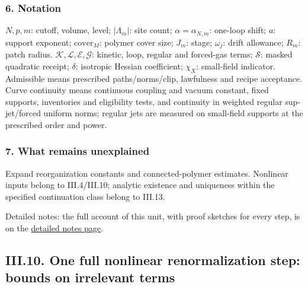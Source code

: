\documentclass[
  letterpaper,
  11pt]{article}
\begin{document}
\subsubsection{6. Notation}\label{notation-11}

\(N,p,m\): cutoff, volume, level; \(|\Lambda_m|\): site count;
\(\alpha=\alpha_{N,m}\): one-loop shift; \(a\): support exponent;
\(\mathrm{cover}_M\): polymer cover size; \(J_m\): stage; \(\omega_j\):
drift allowance; \(R_m\): patch radius.
\(\mathcal K,\mathcal L,\mathcal E,\mathcal G\): kinetic, loop, regular
and forced-gas terms; \(\mathcal S\): masked quadratic receipt;
\(\delta\): isotropic Hessian coefficient; \(\chi_X\): small-field
indicator. Admissible means prescribed paths/norms/clip, lawfulness and
recipe acceptance. Curve continuity means continuous coupling and vacuum
constant, fixed supports, inventories and eligibility tests, and
continuity in weighted regular sup-jet/forced uniform norms; regular
jets are measured on small-field supports at the prescribed order and
power.

\subsubsection{7. What remains
unexplained}\label{what-remains-unexplained-11}

Expand reorganization constants and connected-polymer estimates.
Nonlinear inputs belong to III.4/III.10; analytic existence and
uniqueness within the specified continuation class belong to III.13.

Detailed notes: the full account of this unit, with proof sketches for
every step, is on the
\href{https://github.com/scottnarmstrong/yang-mills-informalization/blob/main/outline/notes/III-9.md}{detailed
notes page}.

\subsection{III.10. One full nonlinear renormalization step: bounds on
irrelevant
terms}\label{iii.10.-one-full-nonlinear-renormalization-step-bounds-on-irrelevant-terms}
\end{document}
